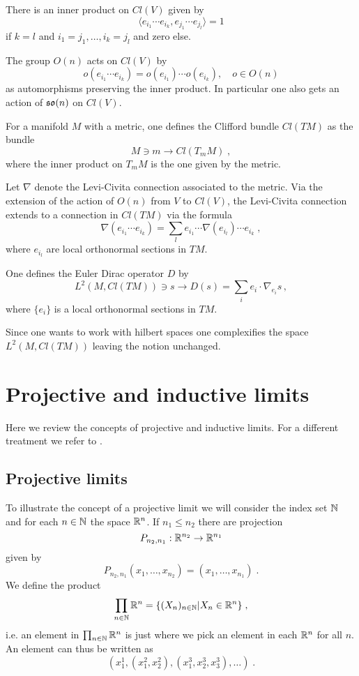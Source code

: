 \documentclass[12pt]{article}
\newcommand{\bbN}{{\Bbb N}}
\newcommand{\bbR}{{\Bbb R}}
\begin{document}
There is an inner product on $Cl(V)$ given by
$$\langle e_{i_1}\cdots e_{i_k} , e_{j_1}\cdots e_{j_l}\rangle =1$$
if $k=l$ and $i_1=j_1,\ldots ,i_k=j_l$ and zero else.

The group $O(n)$ acts on $Cl(V)$ by 
$$o(e_{i_1}\cdots e_{i_k})=o(e_{i_1})\cdots o(e_{i_k}),\quad o\in O(n)$$
as automorphisms preserving the inner product. In particular one also gets an action of $\frak{so}(n)$ on $Cl(V)$.


For a manifold $M$ with a metric, one defines the Clifford bundle $Cl(TM)$ as 
the bundle 
$$M\ni m \to Cl(T_mM )\;,$$
where the inner product on $T_mM$ is the one given by the metric. 

Let $\nabla$ denote the Levi-Civita connection associated to the metric. Via the extension of the action of $O(n)$ from $V$ to $Cl(V)$, the Levi-Civita connection extends to a connection in $Cl(TM)$ via the formula
$$\nabla (e_{i_1}\cdots e_{i_k})=\sum_l e_{i_1}\cdots \nabla (e_{i_l})\cdots e_{i_k}\;,$$
where $e_{i_l}$ are local orthonormal sections in $TM$.

One defines the Euler Dirac operator $D$ by
$$L^2(M,Cl(TM))\ni s \to D(s)=\sum_i e_i\cdot \nabla_{e_i}s\,,$$
where $\{ e_i \}$ is a local orthonormal sections in $TM$.   
  
Since one wants to work with hilbert spaces one complexifies  the space $L^2(M,Cl(TM))$ leaving the notion unchanged.








\section{Projective and inductive limits}
\label{proj}

Here we review the concepts of projective and inductive
limits. For a different treatment we refer to \cite{Marolf:1994cj}.

\subsection{Projective limits}
To illustrate the concept of a projective limit we will consider the index set $\bbN$ and for each $n\in \bbN$ the space $\bbR^n$. If $n_1\leq n_2$ there are projection
$$P_{n_2,n_1}: \bbR^{n_2}\to \bbR^{n_1}$$ 
given by
$$P_{n_2,n_1} (x_1,\ldots,x_{n_2})=(x_1,\ldots , x_{n_1})\;.$$
We define the product 
$$\prod_{n\in \bbN}\bbR^n=\{ (X_n)_{n\in \bbN} | X_n\in \bbR^n\}\;,$$
i.e. an element in  $\prod_{n\in  \bbN}\bbR^n$ is just where we pick an element in each $\bbR^n$ for all $n$. An element can thus be written as 
$$(x_1^1,(x_1^2,x_2^2),(x_1^3,x_2^3,x_3^3),\ldots)\;.$$ 
\end{document}
